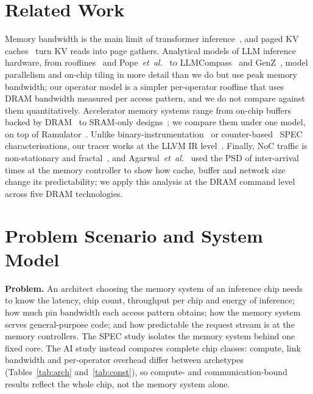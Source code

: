 \documentclass[conference]{IEEEtran}
\begin{document}
\section{Related Work}\label{sec:related}
Memory bandwidth is the main limit of transformer inference~\cite{wulf1995,gholami2024}, and paged KV caches~\cite{kwon2023} turn KV reads into page gathers. Analytical models of LLM inference hardware, from rooflines~\cite{williams2009} and Pope~\emph{et~al.}~\cite{pope2023} to LLMCompass~\cite{zhang2024} and GenZ~\cite{bambhaniya2024}, model parallelism and on-chip tiling in more detail than we do but use peak memory bandwidth; our operator model is a simpler per-operator roofline that uses DRAM bandwidth measured per access pattern, and we do not compare against them quantitatively. Accelerator memory systems range from on-chip buffers backed by DRAM~\cite{jouppi2017} to SRAM-only designs~\cite{abts2020,lie2023}; we compare them under one model, on top of Ramulator~\cite{kim2016,luo2024}. Unlike binary-instrumentation~\cite{luk2005} or counter-based~\cite{limaye2018} SPEC characterisations, our tracer works at the LLVM IR level~\cite{lattner2004}. Finally, NoC traffic is non-stationary and fractal~\cite{bogdan2010}, and Agarwal~\emph{et~al.}~\cite{agarwal2025} used the PSD of inter-arrival times at the memory controller to show how cache, buffer and network size change its predictability; we apply this analysis at the DRAM command level across five DRAM technologies.

\section{Problem Scenario and System Model}\label{sec:model}
\textbf{Problem.} An architect choosing the memory system of an inference chip needs to know the latency, chip count, throughput per chip and energy of inference; how much pin bandwidth each access pattern obtains; how the memory system serves general-purpose code; and how predictable the request stream is at the memory controllers. The SPEC study isolates the memory system behind one fixed core. The AI study instead compares complete chip classes: compute, link bandwidth and per-operator overhead differ between archetypes (Tables~\ref{tab:arch} and~\ref{tab:const}), so compute- and communication-bound results reflect the whole chip, not the memory system alone.
\end{document}
